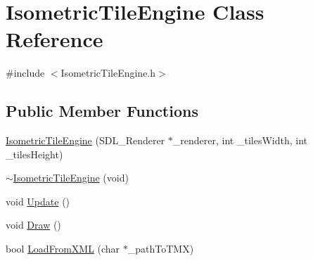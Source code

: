 \hypertarget{class_isometric_tile_engine}{\section{Isometric\-Tile\-Engine Class Reference}
\label{class_isometric_tile_engine}
}


{\ttfamily \#include $<$Isometric\-Tile\-Engine.\-h$>$}

\subsection*{Public Member Functions}
\begin{DoxyCompactItemize}
\item 
\hyperlink{class_isometric_tile_engine_af9a766bfe8514a4d2554d6d574cd7a1d}{Isometric\-Tile\-Engine} (S\-D\-L\-\_\-\-Renderer $\ast$\-\_\-renderer, int \-\_\-tiles\-Width, int \-\_\-tiles\-Height)
\item 
\hyperlink{class_isometric_tile_engine_a279b6dc6e3baa6f3dac19d7e6c7740e3}{$\sim$\-Isometric\-Tile\-Engine} (void)
\item 
void \hyperlink{class_isometric_tile_engine_a4c163c820bfc4b3fba05a0127f030cc0}{Update} ()
\item 
void \hyperlink{class_isometric_tile_engine_ad1da980ee1b9972dd05b51167fa32573}{Draw} ()
\item 
bool \hyperlink{class_isometric_tile_engine_ac0da404c4c4a4129c6da8eeb66bf3f32}{Load\-From\-X\-M\-L} (char $\ast$\-\_\-path\-To\-T\-M\-X)
\end{DoxyCompactItemize}


